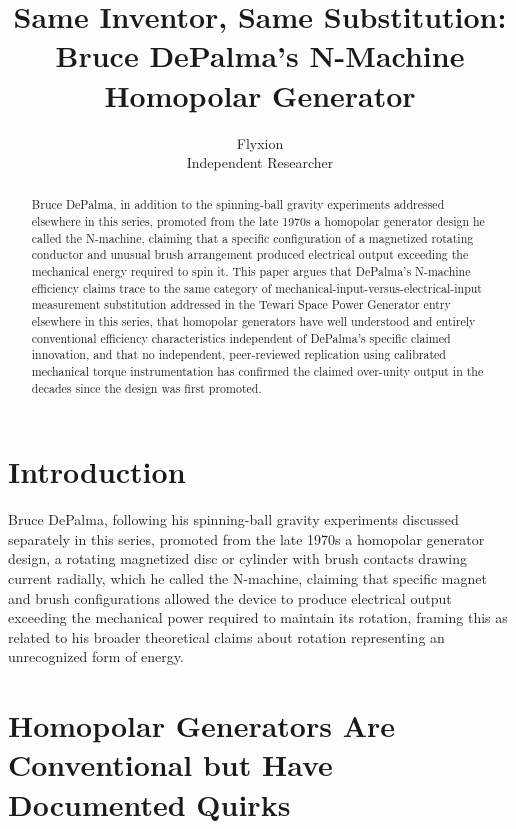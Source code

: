 \documentclass[11pt]{article}
\title{Same Inventor, Same Substitution: Bruce DePalma's N-Machine Homopolar Generator}
\author{Flyxion \\ \small Independent Researcher}
\date{}
\begin{document}
\maketitle

\begin{abstract}
Bruce DePalma, in addition to the spinning-ball gravity experiments addressed elsewhere in this series, promoted from the late 1970s a homopolar generator design he called the N-machine, claiming that a specific configuration of a magnetized rotating conductor and unusual brush arrangement produced electrical output exceeding the mechanical energy required to spin it. This paper argues that DePalma's N-machine efficiency claims trace to the same category of mechanical-input-versus-electrical-input measurement substitution addressed in the Tewari Space Power Generator entry elsewhere in this series, that homopolar generators have well understood and entirely conventional efficiency characteristics independent of DePalma's specific claimed innovation, and that no independent, peer-reviewed replication using calibrated mechanical torque instrumentation has confirmed the claimed over-unity output in the decades since the design was first promoted.
\end{abstract}

\section{Introduction}

Bruce DePalma, following his spinning-ball gravity experiments discussed separately in this series, promoted from the late 1970s a homopolar generator design, a rotating magnetized disc or cylinder with brush contacts drawing current radially, which he called the N-machine, claiming that specific magnet and brush configurations allowed the device to produce electrical output exceeding the mechanical power required to maintain its rotation, framing this as related to his broader theoretical claims about rotation representing an unrecognized form of energy.

\section{Homopolar Generators Are Conventional but Have Documented Quirks}
\end{document}
